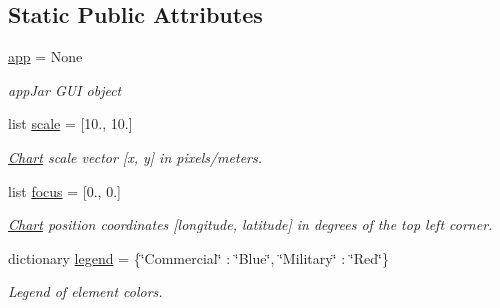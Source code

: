 \subsection*{Static Public Attributes}
\begin{DoxyCompactItemize}
\item 
\mbox{\label{classchart_1_1_chart_a3a4606ea29ff14059be87ab9d21c962d}} 
\hyperlink{classchart_1_1_chart_a3a4606ea29ff14059be87ab9d21c962d}{app} = None
\begin{DoxyCompactList}\small\item\em app\+Jar G\+UI object \end{DoxyCompactList}\item 
\mbox{\label{classchart_1_1_chart_a9337787b3748de4a6dd722074ff6e7b4}} 
list \hyperlink{classchart_1_1_chart_a9337787b3748de4a6dd722074ff6e7b4}{scale} = \mbox{[}10., 10.\mbox{]}
\begin{DoxyCompactList}\small\item\em \hyperlink{classchart_1_1_chart}{Chart} scale vector \mbox{[}x, y\mbox{]} in pixels/meters. \end{DoxyCompactList}\item 
\mbox{\label{classchart_1_1_chart_ab776802bbb212893c7ec9639ddb95ea7}} 
list \hyperlink{classchart_1_1_chart_ab776802bbb212893c7ec9639ddb95ea7}{focus} = \mbox{[}0., 0.\mbox{]}
\begin{DoxyCompactList}\small\item\em \hyperlink{classchart_1_1_chart}{Chart} position coordinates \mbox{[}longitude, latitude\mbox{]} in degrees of the top left corner. \end{DoxyCompactList}\item 
\mbox{\label{classchart_1_1_chart_aa86da6b6e5597272d03d109491a380d0}} 
dictionary \hyperlink{classchart_1_1_chart_aa86da6b6e5597272d03d109491a380d0}{legend} = \{\char`\"{}Commercial\char`\"{} \+: \char`\"{}Blue\char`\"{}, \char`\"{}Military\char`\"{} \+: \char`\"{}Red\char`\"{}\}
\begin{DoxyCompactList}\small\item\em Legend of element colors. \end{DoxyCompactList}\end{DoxyCompactItemize}


